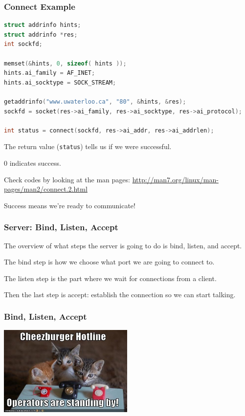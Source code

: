 \begin{frame}[fragile]
\frametitle{Connect Example}

\begin{lstlisting}[language=C]
struct addrinfo hints;
struct addrinfo *res;
int sockfd;

memset(&hints, 0, sizeof( hints ));
hints.ai_family = AF_INET;
hints.ai_socktype = SOCK_STREAM;

getaddrinfo("www.uwaterloo.ca", "80", &hints, &res);
sockfd = socket(res->ai_family, res->ai_socktype, res->ai_protocol);

int status = connect(sockfd, res->ai_addr, res->ai_addrlen);
\end{lstlisting}

The return value (\texttt{status}) tells us if we were successful.

0 indicates success.

Check codes by looking at the man pages: \url{http://man7.org/linux/man-pages/man2/connect.2.html}

Success means we're ready to communicate!

\end{frame}




\begin{frame}
\frametitle{Server: Bind, Listen, Accept}


The overview of what steps the server is going to do is bind, listen, and accept. 

The bind step is how we choose what port we are going to connect to. 

The listen step is the part where we wait for connections from a client. 

Then the last step is accept: establish the connection so we can start talking.

\end{frame}


\begin{frame}
\frametitle{Bind, Listen, Accept}

\begin{center}
	\includegraphics[width=0.5\textwidth]{images/cheezburger.jpeg}
\end{center}

\end{frame}


